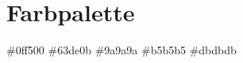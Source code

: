 \documentclass[12pt, letterpaper]{article}
\begin{document}
\begin{center}
\end{center}

\section{Farbpalette}
\colorbox{color1}{\#0ff500}
\colorbox{color2}{\#63de0b}
\colorbox{color3}{\#9a9a9a}
\colorbox{color4}{\#b5b5b5}
\colorbox{color5}{\#dbdbdb}
\end{document}
